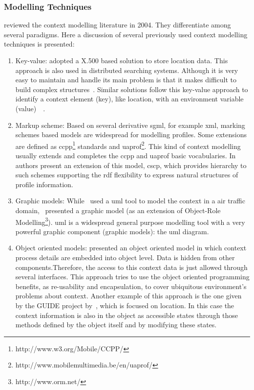 
\subsubsection{Modelling Techniques}
\label{sec:modelling_techniques}

\citet{strang_context_2004} reviewed the context modelling literature in 2004.
They differentiate among several paradigms. Here a discussion of several 
previously used context modelling techniques is presented:

\begin{enumerate}
  \item Key-value: \citet{maass_location_aware_1998} adopted a X.500 based 
  solution to store location data. This approach is also used in distributed 
  searching systems. Although it is very easy to maintain and handle its main 
  problem is that it makes difficult to build complex structures~\citep{strang_context_2004}. 
  Similar solutions follow this key-value approach to identify a context element 
  (key), like location, with an environment variable (value)~\citep{schilit_customizing_1993}~\citep{voelker_mobisaic_1996}. 
  
  \item Markup scheme: Based on several derivative \ac{sgml}, for example 
  \ac{xml}, marking schemes based models are widespread for modelling profiles. 
  Some extensions are defined as \ac{ccpp}\footnote{http://www.w3.org/Mobile/CCPP/} 
  standards and \ac{uaprof}\footnote{http://www.mobilemultimedia.be/en/uaprof/}. 
  This kind of context modelling usually extends and completes the \ac{ccpp} and 
  \ac{uaprof} basic vocabularies. In~\citep{held_modeling_2002} authors present 
  an extension of this model, \ac{cscp}, which provides hierarchy to such schemes 
  supporting the \ac{rdf} flexibility to express natural structures of profile 
  information.
  
  \item Graphic models: While~\citet{bauer_identification_2003} used a \ac{uml} 
  tool to model the context in a air traffic domain,~\citet{henricksen_generating_2003} 
  presented a graphic model (as an extension of Object-Role Modelling\footnote{http://www.orm.net/}). 
  \ac{uml} is a widespread general purpose modelling tool with a very powerful 
  graphic component (graphic models): the \ac{uml} diagram. 
  
  \item Object oriented models: \citet{strang_context_2004} presented an object 
  oriented model in which context process details are embedded into object level. 
  Data is hidden from other components.Therefore, the access to this context data 
  is just allowed through several interfaces. This approach tries to use the 
  object oriented programming benefits, as re-usability and encapsulation, to 
  cover ubiquitous environment's problems about context. Another example of this 
  approach is the one given by the GUIDE project by~\citet{cheverst_design_1999}, 
  which is focused on location. In this case the context information is also in 
  the object as accessible states through those methods defined by the object 
  itself and by modifying these states.
  

\end{enumerate}
